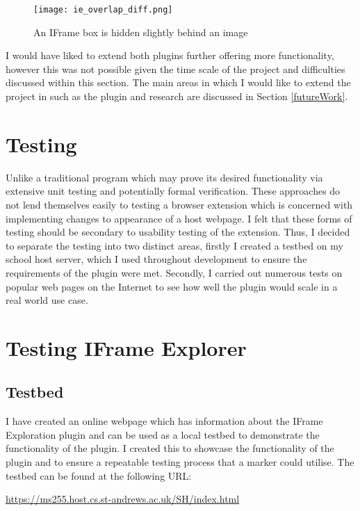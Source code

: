\documentclass[12pt]{article}
\begin{document}
\begin{figure}[H]
    \centering
    \texttt{[image: ie\_overlap\_diff.png]}
    \caption{An IFrame box is hidden slightly behind an image}
    \label{fig:ie_overlap_diff}
\end{figure}

I would have liked to extend both plugins further offering more functionality, however this was not possible given the time scale of the project and difficulties discussed within this section. The main areas in which I would like to extend the project in such as the plugin and research are discussed in Section \ref{futureWork}.

\section{Testing}
Unlike a traditional program which may prove its desired functionality via extensive unit testing and potentially formal verification. These approaches do not lend themselves easily to testing a browser extension which is concerned with implementing changes to appearance of a host webpage. I felt that these forms of testing should be secondary to usability testing of the extension. Thus, I decided to separate the testing into two distinct areas, firstly I created a testbed on my school host server, which I used throughout development to ensure the requirements of the plugin were met. Secondly, I carried out numerous tests on popular web pages on the Internet to see how well the plugin would scale in a real world use case. 

\section{Testing IFrame Explorer}

\subsection{Testbed}
I have created an online webpage which has information about the IFrame Exploration plugin and can be used as a local testbed to demonstrate the functionality of the plugin. I created this to showcase the functionality of the plugin and to ensure a repeatable testing process that a marker could utilise. The testbed can be found at the following URL: 

\begin{center}
\url{https://ms255.host.cs.st-andrews.ac.uk/SH/index.html}
\end{center}
\end{document}
